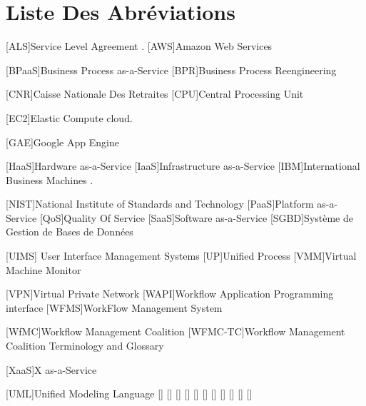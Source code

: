  
 \chapter*{Liste Des Abréviations}
 \begin{acronym}
 		{Service Level Agreement} .	 
 		{Amazon Web Services}
 		
 		    [BPaaS]{Business Process as-a-Service}	 
 		{Business Process Reengineering} 
 		
 		   {Caisse Nationale Des Retraites}
 			[CPU]{Central Processing Unit}
 		
 [EC2]{Elastic Compute cloud}.
 		
 		  	[GAE]{Google App Engine}	
 		
 		[HaaS]{Hardware as-a-Service}
 		[IaaS]{Infrastructure as-a-Service}	
 	[IBM]{International Business Machines}	 .
 	
 	
 	
 	    [NIST]{National Institute of Standards and Technology} 	
 	    			[PaaS]{Platform as-a-Service}	
 	   [QoS]{Quality Of Service}	 
 	   	[SaaS]{Software as-a-Service}	
 	   	  [SGBD]{Système de Gestion de Bases de Données}

    	
    	


 [UIMS]{ User Interface Management Systems}
 	    	       [UP]{Unified Process}
[VMM]{Virtual Machine Monitor}  

 	  [VPN]{Virtual Private Network}
[WAPI]{Workflow Application Programming interface}
    	[WFMS]{WorkFlow Management System}
    	
    	
    	[WfMC]{Workflow Management Coalition }
    	[WFMC-TC]{Workflow Management Coalition Terminology and Glossary}		
    
	[XaaS]{X as-a-Service}	

 	  
 	  
 	  
 	  
 
 	       	  

 	       [UML]{Unified Modeling Language}
 	       \acro{}[]{}
 	       \acro{}[]{}
 	       \acro{}[]{}
 	       \acro{}[]{}
 	       \acro{}[]{}
 	       \acro{}[]{}
 	       \acro{}[]{}
 	       \acro{}[]{}
 	       \acro{}[]{}
 	       \acro{}[]{}
 	       \acro{}[]{}
 	      
 	       
 \end{acronym}
 
